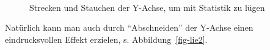 \documentclass[
  letterpaper,
]{scrbook}
\theoremstyle{definition}
\theoremstyle{definition}
\theoremstyle{definition}
\theoremstyle{remark}
\begin{document}
\begin{figure}
\begin{minipage}{0.45\linewidth}
{}


\end{minipage}%
%
\begin{minipage}{0.10\linewidth}
~\end{minipage}%
%
\begin{minipage}{0.45\linewidth}



\end{minipage}%

\caption{\label{fig-lie1}Strecken und Stauchen der Y-Achse, um mit
Statistik zu lügen}

\end{figure}%

Natürlich kann man auch durch \enquote{Abschneiden} der Y-Achse einen
eindrucksvollen Effekt erzielen, s. Abbildung~\ref{fig-lie2}.
\end{document}

